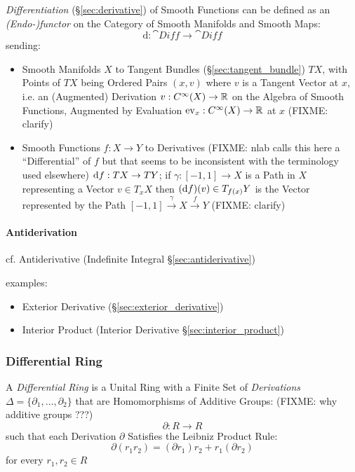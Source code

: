 \fist \emph{Differentiation} (\S\ref{sec:derivative}) of Smooth Functions can be
defined as an \emph{(Endo-)functor} on the Category of Smooth Manifolds and
Smooth Maps:
\[
  \mathrm{d} : \cat{Diff} \rightarrow \cat{Diff}
\]
sending:
\begin{itemize}
  \item Smooth Manifolds $X$ to Tangent Bundles (\S\ref{sec:tangent_bundle}) $T
    X$, with Points of $T X$ being Ordered Pairs $(x, v)$ where $v$ is a Tangent
    Vector at $x$, i.e. an (Augmented) Derivation $v : C^\infty(X) \rightarrow
    \mathbb{R}$ on the Algebra of Smooth Functions, Augmented by Evaluation
    $\mathrm{ev}_x : C^\infty(X) \rightarrow \mathbb{R}$ at $x$ (FIXME: clarify)
  \item Smooth Functions $f : X \rightarrow Y$ to Derivatives (FIXME: nlab calls
    this here a ``Differential'' of $f$ but that seems to be inconsistent with
    the terminology used elsewhere) $\mathrm{d}f : TX \rightarrow TY$; if $\gamma
    : [-1,1] \rightarrow X$ is a Path in $X$ representing a Vector
    $v \in T_x{X}$ then $(\mathrm{d}f)(v) \in T_{f(x)}Y$ is the Vector represented
    by the Path $[-1, 1] \xrightarrow{\gamma} X \xrightarrow{f} Y$
    (FIXME: clarify)
\end{itemize}



\paragraph{Antiderivation}\label{sec:antiderivation}\hfill

cf. Antiderivative (Indefinite Integral \S\ref{sec:antiderivative})

examples:
\begin{itemize}
  \item Exterior Derivative (\S\ref{sec:exterior_derivative})
  \item Interior Product (Interior Derivative \S\ref{sec:interior_product})
\end{itemize}



\subsubsection{Differential Ring}\label{sec:differential_ring}

A \emph{Differential Ring} is a Unital Ring with a Finite Set of
\emph{Derivations} $\Delta = \{ \partial_1, \ldots, \partial_2 \}$ that are
Homomorphisms of Additive Groups: (FIXME: why additive groups ???)
\[
  \partial : R \rightarrow R
\]
such that each Derivation $\partial$ Satisfies the Leibniz Product Rule:
\[
  \partial(r_1r_2) = (\partial{r_1})r_2 + r_1(\partial{r_2})
\]
for every $r_1, r_2 \in R$


